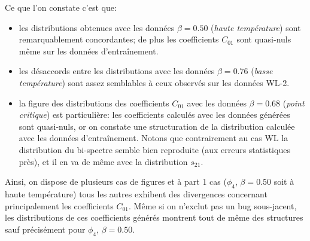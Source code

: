 \documentclass[12pt,twoside]{article}
\newcommand{\itemb}{\item[$\bullet$]}
\begin{document}
Ce que l'on constate c'est que:
\begin{itemize}
\itemb les distributions obtenues avec les données $\beta=0.50$ (\textit{haute température}) sont remarquablement concordantes; de plus les coefficients $C_{01}$ sont quasi-nuls même sur les données d'entraînement.
\itemb les désaccords entre les distributions avec les données $\beta=0.76$ (\textit{basse température}) sont assez semblables à ceux observés sur les données WL-2.
\itemb la figure des distributions des coefficients $C_{01}$ avec les données $\beta=0.68$ (\textit{point critique}) est particulière: les coefficients calculés avec les données générées sont quasi-nuls, or on constate une structuration de la distribution calculée avec les données d'entraînement. Notons que contrairement au cas WL la distribution du bi-spectre semble bien reproduite (aux erreurs statistiques près), et il en va de même avec la distribution $s_{21}$.
\end{itemize}
Ainsi, on dispose de plusieurs cas de figures et à part 1 cas ($\phi_4$, $\beta=0.50$ soit à haute température) tous les autres exhibent des divergences concernant principalement les coefficients $C_{01}$. Même si on n'exclut pas un bug sous-jacent, les distributions de ces coefficients générés montrent tout de même des structures sauf précisément pour $\phi_4$, $\beta=0.50$.
\end{document}
